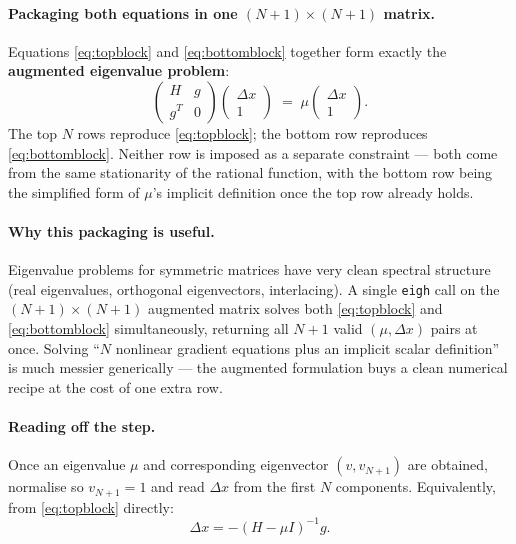 \documentclass[11pt]{article}
\newcommand{\dx}{\Delta x}
\begin{document}
\paragraph{Packaging both equations in one $(N{+}1) \times (N{+}1)$ matrix.}
Equations \eqref{eq:topblock} and \eqref{eq:bottomblock} together form
exactly the \textbf{augmented eigenvalue problem}:
\begin{equation}\label{eq:augmented}
  \begin{pmatrix} H & g \\ g^T & 0 \end{pmatrix}
  \begin{pmatrix} \dx \\ 1 \end{pmatrix}
  \;=\; \mu
  \begin{pmatrix} \dx \\ 1 \end{pmatrix}.
\end{equation}
The top $N$ rows reproduce \eqref{eq:topblock}; the bottom row reproduces
\eqref{eq:bottomblock}.  Neither row is imposed as a separate constraint ---
both come from the same stationarity of the rational function, with the
bottom row being the simplified form of $\mu$'s implicit definition once
the top row already holds.

\paragraph{Why this packaging is useful.}
Eigenvalue problems for symmetric matrices have very clean spectral
structure (real eigenvalues, orthogonal eigenvectors, interlacing).  A
single \texttt{eigh} call on the $(N{+}1) \times (N{+}1)$ augmented matrix
solves both \eqref{eq:topblock} and \eqref{eq:bottomblock} simultaneously,
returning all $N+1$ valid $(\mu, \dx)$ pairs at once.  Solving ``$N$
nonlinear gradient equations plus an implicit scalar definition'' is much
messier generically --- the augmented formulation buys a clean numerical
recipe at the cost of one extra row.

\paragraph{Reading off the step.}
Once an eigenvalue $\mu$ and corresponding eigenvector $(v, v_{N+1})$ are
obtained, normalise so $v_{N+1} = 1$ and read $\dx$ from the first $N$
components.  Equivalently, from \eqref{eq:topblock} directly:
\begin{equation}\label{eq:shift-invert}
  \boxed{\;\dx = -(H - \mu I)^{-1} g.\;}
\end{equation}
\end{document}
